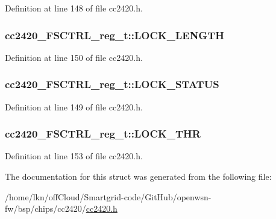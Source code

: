 Definition at line 148 of file cc2420.\+h.

\subsubsection[{\texorpdfstring{L\+O\+C\+K\+\_\+\+L\+E\+N\+G\+TH}{LOCK_LENGTH}}]{ cc2420\+\_\+\+F\+S\+C\+T\+R\+L\+\_\+reg\+\_\+t\+::\+L\+O\+C\+K\+\_\+\+L\+E\+N\+G\+TH}\hypertarget{structcc2420___f_s_c_t_r_l__reg__t_a6d93c3225803ecc189506d6026293148}{}\label{structcc2420___f_s_c_t_r_l__reg__t_a6d93c3225803ecc189506d6026293148}


Definition at line 150 of file cc2420.\+h.

\subsubsection[{\texorpdfstring{L\+O\+C\+K\+\_\+\+S\+T\+A\+T\+US}{LOCK_STATUS}}]{ cc2420\+\_\+\+F\+S\+C\+T\+R\+L\+\_\+reg\+\_\+t\+::\+L\+O\+C\+K\+\_\+\+S\+T\+A\+T\+US}\hypertarget{structcc2420___f_s_c_t_r_l__reg__t_a50864762b6f8331d2fe5fd824c1858ed}{}\label{structcc2420___f_s_c_t_r_l__reg__t_a50864762b6f8331d2fe5fd824c1858ed}


Definition at line 149 of file cc2420.\+h.

\subsubsection[{\texorpdfstring{L\+O\+C\+K\+\_\+\+T\+HR}{LOCK_THR}}]{ cc2420\+\_\+\+F\+S\+C\+T\+R\+L\+\_\+reg\+\_\+t\+::\+L\+O\+C\+K\+\_\+\+T\+HR}\hypertarget{structcc2420___f_s_c_t_r_l__reg__t_aba0a5677458734833bf2cd9de62217c4}{}\label{structcc2420___f_s_c_t_r_l__reg__t_aba0a5677458734833bf2cd9de62217c4}


Definition at line 153 of file cc2420.\+h.



The documentation for this struct was generated from the following file\+:\begin{DoxyCompactItemize}
\item 
/home/lkn/off\+Cloud/\+Smartgrid-\/code/\+Git\+Hub/openwsn-\/fw/bsp/chips/cc2420/\hyperlink{cc2420_8h}{cc2420.\+h}\end{DoxyCompactItemize}
